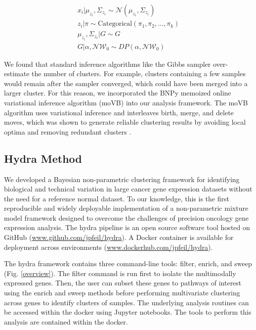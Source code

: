 \documentclass[10pt,letterpaper]{article}
\begin{document}
\begin{gather}
\label{eq:mm}
x_i | \mu_{z_i}, \Sigma_{z_i} \sim \mathcal{N}(\mu_{z_i}, \Sigma_{z_i}) \\
z_i | \pi \sim \text{Categorical}(\pi_1, \pi_2, ..., \pi_k) \\
\mu_{z_i}, \Sigma_{z_i} | G \sim G \\
G | \alpha, \mathcal{NW}_0 \sim DP(\alpha, \mathcal{NW}_0)
\end{gather}

We found that standard inference algorithms like the Gibbs sampler over-estimate the number of clusters. For example, clusters containing a few samples would remain after the sampler converged, which could have been merged into a larger cluster. For this reason, we incorporated the BNPy memoized online variational inference algorithm (moVB) \cite{hughes2013memoized} into our analysis framework. The moVB algorithm uses variational inference and interleaves birth, merge, and delete moves, which was shown to generate reliable clustering results by avoiding local optima and removing redundant clusters \cite{hughesBnpyReliableScalable}. 

\subsection{Hydra Method}
We developed a Bayesian non-parametric clustering framework for identifying biological and technical variation in large cancer gene expression datasets without the need for a reference normal dataset. To our knowledge, this is the first reproducible and widely deployable implementation of a non-parametric mixture model framework designed to overcome the challenges of precision oncology gene expression analysis. The hydra pipeline is an open source software tool hosted on GitHub (\url{www.github.com/jpfeil/hydra}). A Docker container is available for deployment across environments (\url{www.dockerhub.com/jpfeil/hydra}).

The hydra framework contains three command-line tools: filter, enrich, and sweep (Fig. \ref{overview}). The filter command is run first to isolate the multimodally expressed genes. Then, the user can subset these genes to pathways of interest using the enrich and sweep methods before performing multivariate clustering across genes to identify clusters of samples. The underlying analysis routines can be accessed within the docker using Jupyter notebooks. The tools to perform this analysis are contained within the docker.
\end{document}
